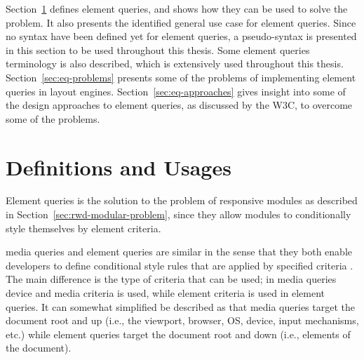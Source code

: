 \documentclass[a4paper,11pt]{kth-mag}
\begin{document}
    Section~\ref{sec:eq-definitions} defines element queries, and shows how they can be used to solve the problem.
    It also presents the identified general use case for element queries.
    Since no syntax have been defined yet for element queries, a pseudo-syntax is presented in this section to be used throughout this thesis.
    Some element queries terminology is also described, which is extensively used throughout this thesis.
    Section~\ref{sec:eq-problems} presents some of the problems of implementing element queries  in \glspl{layout engine}.
    Section~\ref{sec:eq-approaches} gives insight into some of the design approaches to element queries, as discussed by the W3C, to overcome some of the problems.

    \section{Definitions and Usages}\label{sec:eq-definitions}
      \noindent
      Element queries is the solution to the problem of \gls{responsive} modules as described in Section~\ref{sec:rwd-modular-problem}, since they allow modules to conditionally style themselves by element criteria.

      \Gls{media queries} and element queries are similar in the sense that they both enable developers to define conditional style rules that are applied by specified criteria \cite{w3c_css_mq}.
      The main difference is the type of criteria that can be used; in \gls{media queries} device and media criteria is used, while element criteria is used in element queries.
      It can somewhat simplified be described as that \gls{media queries} target the \gls{document} root and up (i.e., the \gls{viewport}, \gls{browser}, OS, device, input mechanisms, etc.) while element queries target the \gls{document} root and down (i.e., \glspl{element} of the \gls{document}).
\end{document}
